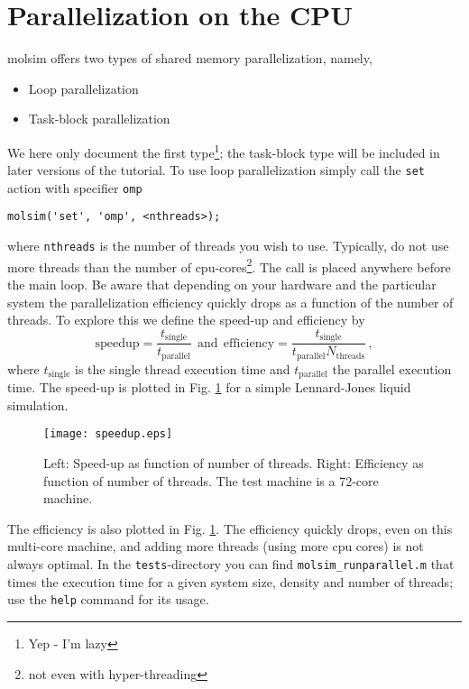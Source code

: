\documentclass[11pt]{article}
\begin{document}
\section{Parallelization on the CPU}
\textsf{molsim} offers two types of shared memory parallelization, namely,
\begin{itemize}
\item Loop parallelization 
\item Task-block parallelization
\end{itemize}
We here only document the first type\footnote{Yep - I'm lazy}; the task-block
type will be included in later versions of the tutorial. To use loop
parallelization simply call the \verb!set! action with specifier \verb!omp!
\begin{verbatim}
molsim('set', 'omp', <nthreads>);
\end{verbatim}
where \verb!nthreads! is the number of threads you wish to use. Typically, do
not use more threads than the number of cpu-cores\footnote{not even with
  hyper-threading}.  The call is placed anywhere before the main loop. Be aware
that depending on your hardware and the particular system the parallelization
efficiency quickly drops as a function of the number of threads. To explore this we
define the speed-up and efficiency by
\begin{equation}
  \mathrm{speedup} = \frac{t_\mathrm{single}}{t_\mathrm{parallel}} \ \
  \mathrm{and} \ \ 
  \mathrm{efficiency} = \frac{t_\mathrm{single}}{t_\mathrm{parallel}
    N_\mathrm{threads}}
  \, ,
\end{equation}
where $t_\mathrm{single}$ is the single thread execution time and
$t_\mathrm{parallel}$ the parallel execution time. The speed-up is plotted in
Fig. \ref{fig:bench} for a simple Lennard-Jones liquid simulation.
\begin{figure}[h]
  \begin{center}
    \texttt{[image: speedup.eps]}
  \caption{
    \label{fig:bench}
    Left: Speed-up as function of number of threads. Right: Efficiency as
    function of number of threads. The test machine is a 72-core machine.
  }
  \end{center}
\end{figure}
The efficiency is also plotted in Fig. \ref{fig:bench}. The efficiency quickly
drops, even on this multi-core machine, and adding more threads (using more cpu
cores) is not always optimal. In the \verb!tests!-directory you can find
\verb!molsim_runparallel.m! that times the execution time for a given system
size, density and number of threads; use the \verb!help! command for its usage.
\end{document}
